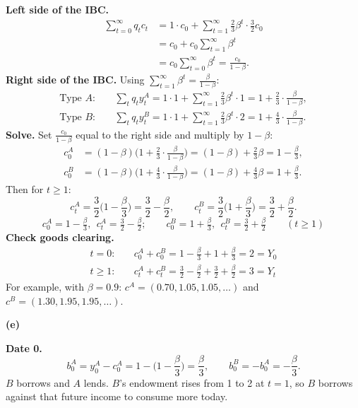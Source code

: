 \documentclass[12pt]{article}
\newcommand{\pt}[1]{\par\bigskip\textbf{(#1)}\par}
\newcommand{\ans}[1]{\[\boxed{\ #1\ }\]}
\begin{document}
\textbf{Left side of the IBC.}
\begin{align*}
\sum_{t=0}^\infty q_tc_t&=1\cdot c_0+\sum_{t=1}^\infty\frac23\beta^t\cdot\frac32c_0\\
&=c_0+c_0\sum_{t=1}^\infty\beta^t\\
&=c_0\sum_{t=0}^\infty\beta^t=\frac{c_0}{1-\beta}.
\end{align*}
\textbf{Right side of the IBC.} Using $\sum_{t=1}^\infty\beta^t=\frac{\beta}{1-\beta}$:
\begin{align*}
\text{Type }A:&\quad\sum_tq_ty^A_t=1\cdot1+\sum_{t=1}^\infty\frac23\beta^t\cdot1=1+\frac23\cdot\frac{\beta}{1-\beta},\\
\text{Type }B:&\quad\sum_tq_ty^B_t=1\cdot1+\sum_{t=1}^\infty\frac23\beta^t\cdot2=1+\frac43\cdot\frac{\beta}{1-\beta}.
\end{align*}
\textbf{Solve.} Set $\frac{c_0}{1-\beta}$ equal to the right side and
multiply by $1-\beta$:
\begin{align*}
c^A_0&=(1-\beta)\Big(1+\frac23\cdot\frac{\beta}{1-\beta}\Big)=(1-\beta)+\frac23\beta=1-\frac\beta3,\\
c^B_0&=(1-\beta)\Big(1+\frac43\cdot\frac{\beta}{1-\beta}\Big)=(1-\beta)+\frac43\beta=1+\frac\beta3 .
\end{align*}
Then for $t\ge1$:
\[
c^A_t=\frac32\Big(1-\frac\beta3\Big)=\frac32-\frac\beta2,\qquad c^B_t=\frac32\Big(1+\frac\beta3\Big)=\frac32+\frac\beta2 .
\]
\ans{c^A_0=1-\tfrac\beta3,\ \ c^A_t=\tfrac32-\tfrac\beta2;\qquad c^B_0=1+\tfrac\beta3,\ \ c^B_t=\tfrac32+\tfrac\beta2\qquad(t\ge1)}
\textbf{Check goods clearing.}
\begin{align*}
t=0:&\quad c^A_0+c^B_0=1-\frac\beta3+1+\frac\beta3=2=Y_0\\
t\ge1:&\quad c^A_t+c^B_t=\frac32-\frac\beta2+\frac32+\frac\beta2=3=Y_t
\end{align*}
For example, with $\beta=0.9$: $c^A=(0.70,1.05,1.05,\dots)$ and
$c^B=(1.30,1.95,1.95,\dots)$.

\pt{e}
\textbf{Date 0.}
\[
b^A_0=y^A_0-c^A_0=1-\Big(1-\frac\beta3\Big)=\frac\beta3,\qquad b^B_0=-b^A_0=-\frac\beta3 .
\]
$B$ borrows and $A$ lends. $B$'s endowment rises from 1 to 2 at $t=1$, so
$B$ borrows against that future income to consume more today.
\end{document}
